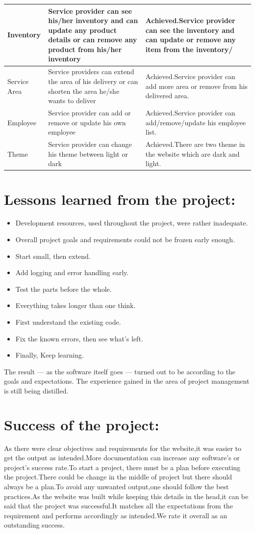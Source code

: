 \documentclass[13pt]{extarticle}
\begin{document}
\begin{center}
\begin{longtable}{ |p{2.5cm}|p{4cm}| p{4cm}| }
\hline
Inventory & Service provider can see his/her inventory and can update any product details or can remove any product from his/her inventory & Achieved.Service provider can see the inventory and can update or remove any item from the inventory/\\
\hline
Service Area & Service providers can extend the area of his delivery or can shorten the area he/she wants to deliver & Achieved.Service provider can add more area or remove from his delivered area. \\
\hline
Employee & Service provider can add or remove or update his own employee & Achieved.Service provider can add/remove/update his employee list.\\
\hline
Theme & Service provider can change his theme between light or dark & Achieved.There are two theme in the website which are dark and light.\\
\hline
\end{longtable}
\end{center}
\section{\textbf{Lessons learned from the project:}}
\begin{itemize}

\item Development resources, used throughout the project, were rather inadequate.
\item Overall project goals and requirements could not be frozen early enough.
\item  Start small, then extend.
\item Add logging and error handling early.
\item Test the parts before the whole.
\item  Everything takes longer than one think.
\item First understand the existing code.
\item  Fix the known errors, then see what’s left.
\item Finally, Keep learning.
\end{itemize}
The result — as the software itself goes — turned out to be according to the goals and expectations. The experience gained in the area of project management is still being distilled.
\newpage
\section{\textbf{Success of the project:}}
As there were clear objectives and requirements for the website,it was easier to get the output as intended.More documentation can increase any software's or project's success rate.To start a project, there must be a plan before executing the project.There could be change in the middle of project but there should always be a plan.To avoid any unwanted output,one should follow the best practices.As the website was built while keeping this details in the head,it can be said that the project was successful.It matches all the expectations from the requirement and performs accordingly as intended.We rate it overall as an outstanding success.
\end{document}
